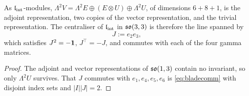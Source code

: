 \begin{proposition}
\label{prop:6plus8plus1}
As $\mathfrak l_{\rm int}$-modules, $\Lambda^2V=\Lambda^2E\oplus(E\otimes U)\oplus\Lambda^2U$, of dimensions $6+8+1$, is the adjoint
representation, two copies of the vector representation, and the trivial representation. The centraliser of $\mathfrak l_{\rm int}$ in
$\mathfrak{so}(3,3)$ is therefore the line spanned by
\[
J:=e_2e_3 ,
\]
which satisfies $J^2=-\mathbf 1$, $J^{\!\top}=-J$, and commutes with each of the four gamma matrices.
\end{proposition}

\begin{proof}
The adjoint and vector representations of $\mathfrak{so}(1,3)$ contain no invariant, so only $\Lambda^2U$ survives. That $J$ commutes
with $e_1,e_4,e_5,e_6$ is \eqref{eq:bladecomm} with disjoint index sets and $|I||J|=2$.
\end{proof}

